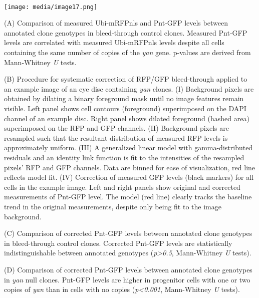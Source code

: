 \textbf{\\
}

\texttt{[image: media/image17.png]}

(A) Comparison of measured Ubi-mRFPnls and Pnt-GFP levels between annotated clone genotypes in bleed-through control clones. Measured Pnt-GFP levels are correlated with measured Ubi-mRFPnls levels despite all cells containing the same number of copies of the \emph{yan} gene. p-values are derived from Mann-Whitney \emph{U} tests.

(B) Procedure for systematic correction of RFP/GFP bleed-through applied to an example image of an eye disc containing \emph{yan} clones. (I) Background pixels are obtained by dilating a binary foreground mask until no image features remain visible. Left panel shows cell contours (foreground) superimposed on the DAPI channel of an example disc. Right panel shows dilated foreground (hashed area) superimposed on the RFP and GFP channels. (II) Background pixels are resampled such that the resultant distribution of measured RFP levels is approximately uniform. (III) A generalized linear model with gamma-distributed residuals and an identity link function is fit to the intensities of the resampled pixels' RFP and GFP channels. Data are binned for ease of visualization, red line reflects model fit. (IV) Correction of measured GFP levels (black markers) for all cells in the example image. Left and right panels show original and corrected measurements of Pnt-GFP level. The model (red line) clearly tracks the baseline trend in the original measurements, despite only being fit to the image background.

(C) Comparison of corrected Pnt-GFP levels between annotated clone genotypes in bleed-through control clones. Corrected Pnt-GFP levels are statistically indistinguishable between annotated genotypes (\emph{p\textgreater{}0.5}, Mann-Whitney \emph{U} tests).

(D) Comparison of corrected Pnt-GFP levels between annotated clone genotypes in \emph{yan} null clones. Pnt-GFP levels are higher in progenitor cells with one or two copies of \emph{yan} than in cells with no copies (\emph{p\textless{}0.001}, Mann-Whitney \emph{U} tests).
